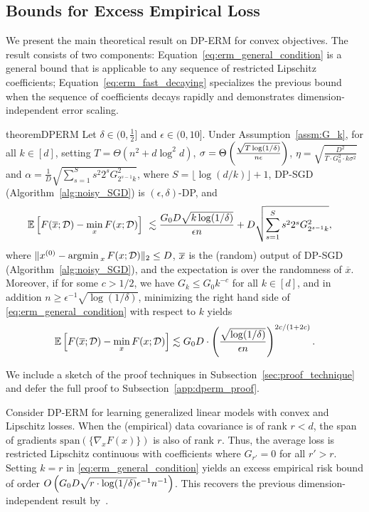 \subsection{Bounds for Excess Empirical Loss}
We present the main theoretical result on DP-ERM for convex objectives. 
The result consists of two components:
Equation~\eqref{eq:erm_general_condition} is a general bound that is applicable to any sequence of restricted Lipschitz coefficients;
Equation~\eqref{eq:erm_fast_decaying} specializes the previous bound when the sequence of coefficients decays rapidly and demonstrates dimension-independent error scaling.
\begin{theo}{theorem}{DPERM}
\label{thm:DPERM}
Let $ \delta \in (0, \frac{1}{2}]$ and $\epsilon\in(0,10]$.
Under Assumption~\ref{assm:G_k}, for all $k \in [d]$, 
setting 
$T=\Theta(n^2 + d \log^2 d)$, $\sigma=\Theta \left( \frac{\sqrt{T\log(1/\delta)}}{n\epsilon} \right)$, $\eta=\sqrt{\frac{D^{2}}{T\cdot G_{0}^{2}\cdot k\sigma^{2}}}$
and $\alpha=\frac{1}{D}\sqrt{\sum_{s=1}^S s^2 2^{s}G_{2^{s-1}k}^{2}}$, where $S = \lfloor \log (d / k) \rfloor + 1$, DP-SGD (Algorithm~\ref{alg:noisy_SGD}) is $(\epsilon,\delta)$-DP, and
\begin{align}
\label{eq:erm_general_condition}
\mathbb{E} \left[  F(\overline{x};\mathcal D)-  \min_x F(x;\mathcal D) \right] &~ \lesssim \frac{G_{0}D\sqrt{k\log(1/\delta)}}{\epsilon n}+D\sqrt{\sum_{s=1}^{S}s^2 2^{s}G_{2^{s-1}k}^{2}},
\end{align}
where $\|x^{(0)}- \mathop{\mathrm{argmin\,}}_x F(x; \mathcal D) \|_2 \le D$, $\overline{x}$ is the (random) output of DP-SGD (Algorithm~\ref{alg:noisy_SGD}), and the expectation is over the randomness of $\overline{x}$.
Moreover, if for some $c>1/2$, we have $G_k\leq G_0 k^{-c}$ for all $k \in [d]$, and in addition $ n\geq \epsilon^{-1} \sqrt{\log(1/\delta)}$,
minimizing the right hand side of \eqref{eq:erm_general_condition} with respect to $k$ yields
\begin{align}
\label{eq:erm_fast_decaying}
\mathbb{E} \left[  F(\overline{x};\mathcal D)-  \min_x F(x;\mathcal D) \right] \lesssim G_{0}D \cdot \left( 
        \frac{\sqrt{\log(1/\delta)}}{\epsilon n}
    \right)^{2c/(1+2c)
}.
\end{align}
\end{theo}
We include a sketch of the proof techniques in Subsection~\ref{sec:proof_technique} and defer the full proof to Subsection~\ref{app:dperm_proof}.
\begin{remark}
Consider DP-ERM for learning generalized linear models with convex and Lipschitz losses.
When the (empirical) data covariance is of rank $r < d$, the span of gradients $\text{span}(\{ \nabla_x F(x) \})$ is also of rank $r$. 
Thus, the average loss is restricted Lipschitz continuous with coefficients where $G_{r'} = 0$ for all $r' > r$. 
Setting $k = r$ in \eqref{eq:erm_general_condition} yields an excess empirical risk bound of order $O\left( {G_{0}D\sqrt{ r \cdot\log(1/\delta)}} \epsilon^{-1} n^{-1} \right)$.
This recovers the previous dimension-independent result by~\cite{song2021evading}.
\end{remark}

